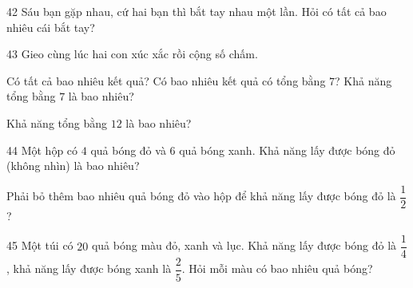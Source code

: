 \gap
\begin{probbox}{42}{}
Sáu bạn gặp nhau, cứ hai bạn thì bắt tay nhau một lần. Hỏi có tất cả bao nhiêu cái bắt tay?
\end{probbox}
\gap
\begin{probbox}{43}{}
Gieo cùng lúc hai con xúc xắc rồi cộng số chấm.\par
{} Có tất cả bao nhiêu kết quả? \quad {} Có bao nhiêu kết quả có tổng bằng $7$? Khả năng tổng bằng $7$ là bao nhiêu?\par
{} Khả năng tổng bằng $12$ là bao nhiêu?
\end{probbox}
\gap
\begin{probbox}{44}{}
Một hộp có $4$ quả bóng đỏ và $6$ quả bóng xanh.  Khả năng lấy được bóng đỏ (không nhìn) là bao nhiêu?\par
{} Phải bỏ thêm bao nhiêu quả bóng đỏ vào hộp để khả năng lấy được bóng đỏ là $\dfrac12$?
\end{probbox}
\gap
\begin{probbox}{45}{}
Một túi có $20$ quả bóng màu đỏ, xanh và lục. Khả năng lấy được bóng đỏ là $\dfrac14$, khả năng lấy được bóng xanh là $\dfrac25$. Hỏi mỗi màu có bao nhiêu quả bóng?
\end{probbox}
\gap
\needspace{7.5cm}
